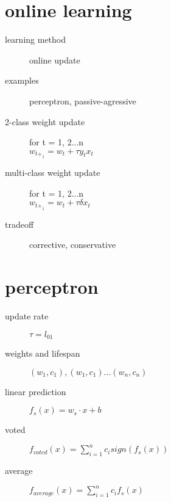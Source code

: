 \documentclass[12pt]{article}
\begin{document}
\begin{multicols}{2}
  \section{online learning}
  \begin{description}
  \item[learning method] online update
  \item[examples] perceptron, passive-agressive
  \item[2-class weight update]
    for t = 1, 2...n \\
    $w_{t+_1} = w_{t} + \tau y_{t} x_{t}$
  \item[multi-class weight update]
    for t = 1, 2...n \\
    $w_{t+_1} = w_{t} + \tau \delta x_t$
  \item[tradeoff] corrective, conservative
  \end{description}

  \section{perceptron}
  \begin{description}
    \item[update rate] $\tau = l_{01}$
    \item[weights and lifespan]  $(w_1, c_1), (w_1, c_1) ... (w_n, c_n)$
    \item[linear prediction] $f_s(x) = w_s \cdot x + b$
    \item[voted] $f_{voted}(x) = \sum_{i=1}^n c_i sign(f_s(x))$
    \item[average] $f_{average}(x) = \sum_{i=1}^n c_i f_s(x)$
  \end{description}


\end{multicols}
\end{document}
